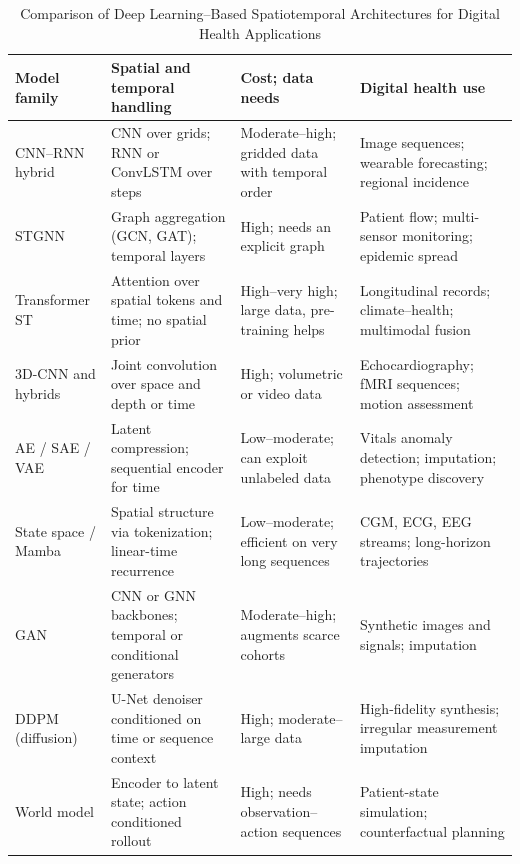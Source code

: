 \documentclass[journal]{IEEEtran}
\newif\ifsubmission
\begin{document}
\ifsubmission\else
\begin{table}[htbp]
\centering
\caption{Comparison of Deep Learning--Based Spatiotemporal Architectures for Digital Health Applications}
\label{tab:st-model-comparison}
\ifsubmission
\scriptsize
\setlength{\tabcolsep}{4pt}
\renewcommand{\arraystretch}{1.05}
\begin{tabularx}{\textwidth}{>{\raggedright\arraybackslash}p{2.4cm} >{\raggedright\arraybackslash}X >{\raggedright\arraybackslash}p{4.0cm} >{\raggedright\arraybackslash}X}
\toprule
\textbf{Model family} & \textbf{Spatial and temporal handling} & \textbf{Cost; data needs} & \textbf{Digital health use} \\
\midrule
CNN--RNN hybrid & CNN over grids; RNN or ConvLSTM over steps & Moderate--high; gridded data with temporal order & Image sequences; wearable forecasting; regional incidence \\
\addlinespace[2pt]
STGNN & Graph aggregation (GCN, GAT); temporal layers & High; needs an explicit graph & Patient flow; multi-sensor monitoring; epidemic spread \\
\addlinespace[2pt]
Transformer ST & Attention over spatial tokens and time; no spatial prior & High--very high; large data, pre-training helps & Longitudinal records; climate--health; multimodal fusion \\
\addlinespace[2pt]
3D-CNN and hybrids & Joint convolution over space and depth or time & High; volumetric or video data & Echocardiography; fMRI sequences; motion assessment \\
\addlinespace[2pt]
AE / SAE / VAE & Latent compression; sequential encoder for time & Low--moderate; can exploit unlabeled data & Vitals anomaly detection; imputation; phenotype discovery \\
\addlinespace[2pt]
State space / Mamba & Spatial structure via tokenization; linear-time recurrence & Low--moderate; efficient on very long sequences & CGM, ECG, EEG streams; long-horizon trajectories \\
\addlinespace[2pt]
GAN & CNN or GNN backbones; temporal or conditional generators & Moderate--high; augments scarce cohorts & Synthetic images and signals; imputation \\
\addlinespace[2pt]
DDPM (diffusion) & U-Net denoiser conditioned on time or sequence context & High; moderate--large data & High-fidelity synthesis; irregular measurement imputation \\
\addlinespace[2pt]
World model & Encoder to latent state; action conditioned rollout & High; needs observation--action sequences & Patient-state simulation; counterfactual planning \\

\end{tabularx}
\end{table}
\end{document}
